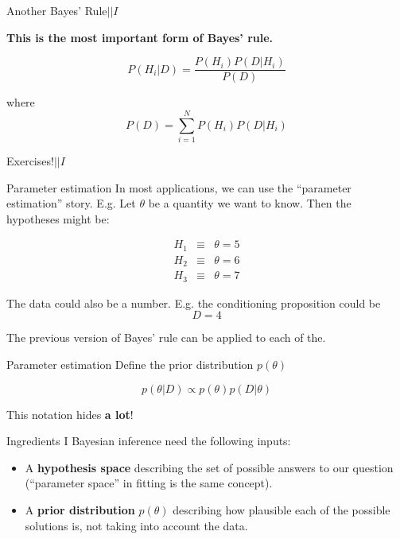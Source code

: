 \documentclass{beamer}
\begin{document}
\begin{frame}[t]{Another Bayes' Rule\hspace{170pt}$|| I$}

{\bf This is the most important form of Bayes' rule.}

\begin{equation}
P(H_i | D) = \frac{P(H_i)P(D|H_i)}{P(D)}
\end{equation}

where
\begin{equation}
P(D) = \sum_{i=1}^N P(H_i)P(D|H_i)
\end{equation}
\end{frame}


\begin{frame}[t]{Exercises!\hspace{170pt}$|| I$}
\end{frame}

\begin{frame}[t]{Parameter estimation}
In most applications, we can use the ``parameter estimation'' story. E.g.
Let $\theta$ be a quantity we want to know. Then the hypotheses might be:

\begin{eqnarray}
H_1 &\equiv& \theta = 5\\
H_2 &\equiv& \theta = 6\\
H_3 &\equiv& \theta = 7
\end{eqnarray}

The data could also be a number. E.g. the conditioning proposition could be
\begin{equation}
D = 4
\end{equation}

The previous version of Bayes' rule can be applied to each of the.
\end{frame}

\begin{frame}[t]{Parameter estimation}
Define the prior distribution $p(\theta)$


\begin{equation}
p(\theta | D) \propto p(\theta)p(D|\theta)
\end{equation}

This notation hides {\bf a lot}!
\end{frame}


\begin{frame}[t]{Ingredients I}
Bayesian inference need the following inputs:

\begin{itemize}
\setlength{\itemsep}{20pt}
\item A {\bf hypothesis space} describing the set of possible answers to our
question (``parameter space'' in fitting is the same concept).
\item A {\bf prior distribution} $p(\theta)$ describing how plausible
each of the possible solutions is, not taking into account the data.
\end{itemize}
\end{frame}
\end{document}
